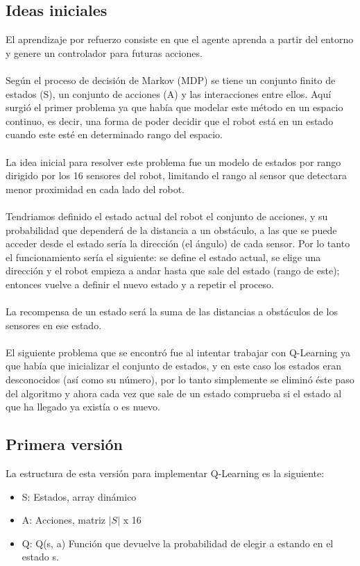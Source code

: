 \documentclass[14pt]{extarticle}
\theoremstyle{definition}
\theoremstyle{remark}
\begin{document}
\subsection{Ideas iniciales}\label{subsec:ideasiniciales}
El aprendizaje por refuerzo consiste en que el agente aprenda a partir del entorno y genere un controlador para futuras acciones.\\\\
Según el proceso de decisión de Markov (MDP) se tiene un conjunto finito de estados (S), un conjunto de acciones (A) y las interacciones entre ellos. Aquí surgió el primer problema ya que había que modelar este método en un espacio continuo, es decir, una forma de poder decidir que el robot está en un estado cuando este esté en determinado rango del espacio. \\\\
La idea inicial para resolver este problema fue un modelo de estados por rango dirigido por los 16 sensores del robot, limitando el rango al sensor que detectara menor proximidad en cada lado del robot.\\\\
Tendriamos definido el estado actual del robot el conjunto de acciones, y su probabilidad que dependerá de la distancia a un obstáculo, a las que se puede acceder desde el estado sería la dirección (el ángulo) de cada sensor. Por lo tanto el funcionamiento sería el siguiente: se define el estado actual, se elige una dirección y el robot empieza a andar hasta que sale del estado (rango de este); entonces vuelve a definir el nuevo estado y a repetir el proceso.\\\\
La recompensa de un estado será la suma de las distancias a obstáculos de los sensores en ese estado.\\\\
El siguiente problema que se encontró fue al intentar trabajar con Q-Learning ya que había que inicializar el conjunto de estados, y en este caso los estados eran desconocidos (así como su número), por lo tanto simplemente se eliminó éste paso del algoritmo y ahora cada vez que sale de un estado comprueba si el estado al que ha llegado ya existía o es nuevo.
\subsection{Primera versión}\label{subsec:primeraversion}
La estructura de esta versión para implementar Q-Learning es la siguiente:
\begin{itemize}
	\item S: Estados, array dinámico
	\item A: Acciones, matriz $|S|$ x 16
	\item Q: Q(s, a) Función que devuelve la probabilidad de elegir a estando en el estado s.
\end{itemize}
\end{document}
